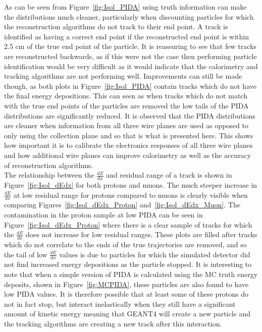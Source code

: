 As can be seen from Figure~\ref{fig:Isol_PIDA} using truth information can make the distributions much cleaner, particularly when discounting particles for which the reconstruction algorithms do not track to their end point. A track is identified as having a correct end point if the reconstructed end point is within 2.5 cm of the true end point of the particle. It is reassuring to see that few tracks are reconstructed backwards, as if this were not the case then performing particle identification would be very difficult as it would indicate that the calorimetry and tracking algorithms are not performing well. Improvements can still be made though, as both plots in Figure~\ref{fig:Isol_PIDA} contain tracks which do not have the final energy depositions. This can seen as when tracks which do not match with the true end points of the particles are removed the low tails of the PIDA distributions are significantly reduced. It is observed that the PIDA distributions are cleaner when information from all three wire planes are used as opposed to only using the collection plane and so that is what is presented here. This shows how important it is to calibrate the electronics responses of all three wire planes and how additional wire planes can improve calorimetry as well as the accuracy of reconstruction algorithms. \\

The relationship between the $\frac{dE}{dx}$ and residual range of a track is shown in Figure~\ref{fig:Isol_dEdx} for both protons and muons. The much steeper increase in $\frac{dE}{dx}$ at low residual range for protons compared to muons is clearly visible when comparing Figures~\ref{fig:Isol_dEdx_Proton} and~\ref{fig:Isol_dEdx_Muon}. The contamination in the proton sample at low PIDA can be seen in Figure~\ref{fig:Isol_dEdx_Proton} where there is a clear sample of tracks for which the $\frac{dE}{dx}$ does not increase for low residual ranges. These plots are filled after tracks which do not correlate to the ends of the true trajectories are removed, and so the tail of low $\frac{dE}{dx}$ values is due to particles for which the simulated detector did not find increased energy depositions as the particle stopped. It is interesting to note that when a simple version of PIDA is calculated using the MC truth energy deposits, shown in Figure~\ref{fig:MCPIDA}, these particles are also found to have low PIDA values. It is therefore possible that at least some of these protons do not in fact stop, but interact inelastically when they still have a significant amount of kinetic energy meaning that GEANT4 will create a new particle and the tracking algorithms are creating a new track after this interaction. \\

